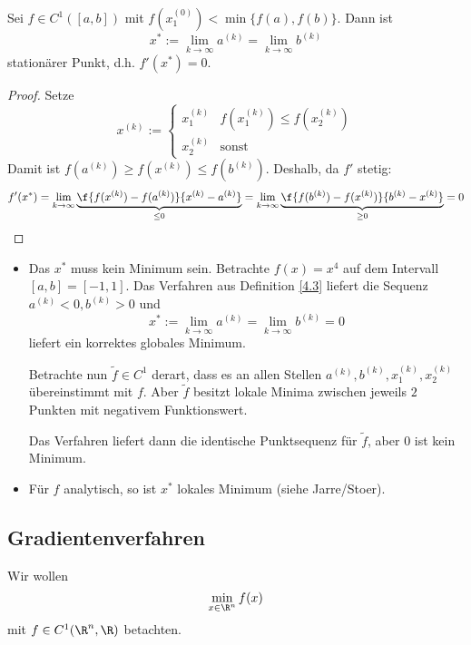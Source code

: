 \documentclass[11pt]{scrbook}
\begin{document}
\begin{st} \label{4.5}
	Sei $f\in C^1([a,b])$ mit $f(x_1^{(0)}) < \min\{f(a),f(b)\}$.
	Dann ist
	\[
		x^* := \lim_{k\to \infty} a^{(k)} = \lim_{k\to \infty}b^{(k)}
	\]
	stationärer Punkt, d.h. $f'(x^*) = 0$.
	\begin{proof}
		Setze 
		\[
			x^{(k)} := \begin{cases}
				x_1^{(k)} & f(x_1^{(k)}) \le f(x_2^{(k)}) \\
				x_2^{(k)} & \text{sonst}
			\end{cases}
		\]
		Damit ist $f(a^{(k)}) \ge f(x^{(k)}) \le f(b^{(k)})$.
		Deshalb, da $f'$ stetig:
		\[
			f'(x^*) = \lim_{k\to \infty} \underbrace{\f {f(x^{(k)})-f(a^{(k)})}{x^{(k)}-a^{(k)}}}_{\le 0} = \lim_{k\to \infty} \underbrace{\f {f(b^{(k)})-f(x^{(k)})}{b^{(k)}-x^{(k)}}}_{\ge 0} = 0
		\]
	\end{proof}
	\begin{note}

		\begin{itemize}
			\item
				Das $x^*$ muss kein Minimum sein.
				Betrachte $f(x) = x^4$ auf dem Intervall $[a,b] = [-1,1]$.
				Das Verfahren aus Definition \ref{4.3} liefert die Sequenz $a^{(k)} < 0, b^{(k)} > 0$ und
				\[
					x^* := \lim_{k\to \infty}a^{(k)} = \lim_{k\to \infty} b^{(k)} = 0
				\]
				liefert ein korrektes globales Minimum.

				Betrachte nun $\tilde f\in C^1$ derart, dass es an allen Stellen $a^{(k)},b^{(k)},x_1^{(k)},x_2^{(k)}$ übereinstimmt mit $f$.
				Aber $\tilde f$ besitzt lokale Minima zwischen jeweils $2$ Punkten mit negativem Funktionswert.

				Das Verfahren liefert dann die identische Punktsequenz für $\tilde f$, aber $0$ ist kein Minimum.
			\item
				Für $f$ analytisch, so ist $x^*$ lokales Minimum (siehe Jarre/Stoer).
		\end{itemize}
	\end{note}
\end{st}


\subsection{Gradientenverfahren}

Wir wollen
\[
	\min_{x\in \R^n} f(x)
\]
mit $f \in C^1 (\R^n, \R)$ betachten.
\end{document}
